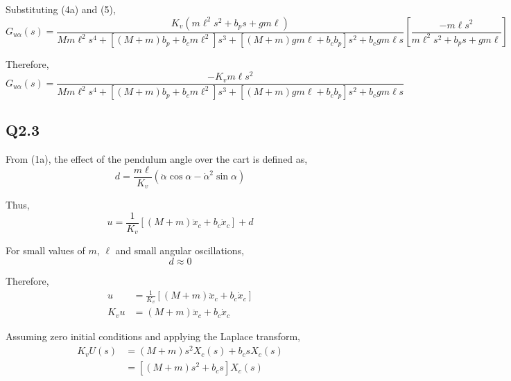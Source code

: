 \documentclass[11pt,a4paper]{article}
\begin{document}
Substituting (4a) and (5),
\begin{equation*}
    G_{u\alpha}(s) = \frac{ K_{v} \left( m \ell^{2} s^{2} + b_{p} s +g m \ell 
	\right)}{M m \ell^{2} s^{4} + \left[ \left( M + m \right) b_{p} + b_{c} 
	m \ell^{2} \right] s^{3} + \left[ \left( M + m \right) g m \ell + b_{c} 
	b_{p} \right] s^{2} + b_{c} g m \ell s} \left[ \frac{-m \ell s^{2}}
	{m \ell^{2} s^{2} + b_{p} s + g m \ell} \right]
\end{equation*}

Therefore,
\begin{equation}
    G_{u\alpha}(s) = \frac{-K_{v} m \ell s^{2}}{M m \ell^{2} s^{4}
    + \left[ \left( M + m \right) b_{p} + b_{c} m \ell^{2} \right] s^{3}
    + \left[ \left( M + m \right) g m \ell + b_{c} b_{p} \right]s^{2}
    + b_{c} g m \ell s} \tag{6}
\end{equation}

\subsection*{Q2.3}

From (1a), the effect of the pendulum angle over the cart is defined as,
\begin{equation*}
    d = \frac{ m \ell}{K_{v}} \left( \ddot{\alpha} \cos\alpha 
	- \dot{\alpha}^{2} \sin\alpha \right)
\end{equation*}

Thus,
\begin{equation*}
    u = \frac{1}{K_{v}} \left[ \left( M + m \right) \ddot{x}_{c}
    + b_{c} \dot{x}_{c} \right] + d
\end{equation*}

For small values of $m$, $\ell$ and small angular oscillations,
\begin{equation*}
    d \approx 0
\end{equation*}

Therefore,
\begin{align*}
    u &= \frac{1}{K_{v}} \left[ \left( M + m \right) \ddot{x}_{c}
    + b_{c} \dot{x}_{c} \right] \\
	K_{v}u &= \left( M + m \right) \ddot{x}_{c} + b_{c} \dot{x}_{c}
\end{align*}

Assuming zero initial conditions and applying the Laplace transform,
\begin{align*}
    K_{v} U(s) &= \left( M + m \right) s^{2} X_{c}(s) + b_{c} s X_{c}(s) \\
	&= \left[ \left( M + m \right) s^{2} + b_{c} s \right] X_{c}(s)
\end{align*}
\end{document}
